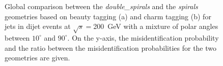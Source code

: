 \begin{figure}[H]
\begin{subfigure}[b]{0.5\textwidth}
    \caption{}
    \label{}
  \end{subfigure}
  \caption{Global comparison between the \textit{double\_spirals} and the \textit{spirals} geometries based on beauty tagging (a) and charm
    tagging (b) for jets in dijet events at $\sqrt{s}=$200~GeV with a mixture of polar
    angles between $10^{\circ}$ and $90^{\circ}$. On the y-axis, the misidentification probability and the ratio between the misidentification probabilities for the two geometries are given.}\label{fig:globalComparison_double_spirals_200}
\end{figure}

